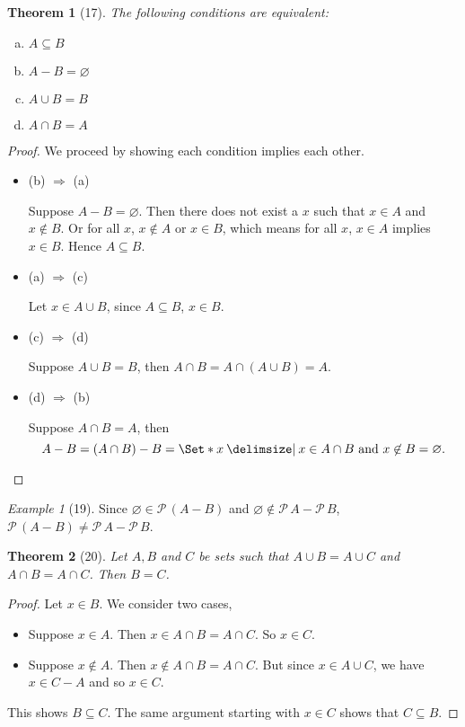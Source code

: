 \documentclass[12pt]{article}
\theoremstyle{plain}
\newtheorem*{exthm}{Theorem}
\theoremstyle{remark}
\newtheorem*{eg}{Example}
\theoremstyle{definition}
\theoremstyle{remark}
\newcommand{\powerset}{\mathscr{P}\,}
\providecommand\st{}
\newcommand\SetSymbol[1][]{%
  \nonscript\:#1\vert%
  \allowbreak%
  \nonscript\:
\mathopen{}}
\renewcommand\st{\SetSymbol[\delimsize]}
\begin{document}
\begin{exthm}[17]
  The following conditions are equivalent:
  \begin{multicols}{2}
    \begin{enumerate}[(a)]
      \item $A \subseteq B$
      \item $A - B = \varnothing$
      \item $A \cup B = B$
      \item $A \cap B = A$
    \end{enumerate}
  \end{multicols}
\end{exthm}
\begin{proof}
  We proceed by showing each condition implies each other.
  \begin{itemize}
    \item (b) $\Rightarrow$ (a)

      Suppose $A - B = \varnothing$. Then there does not exist a $x$ such that $x \in A$ and $x \not\in B$. Or for all $x$, $x \not\in A$ or $x \in B$, which means for all $x$, $x \in A$ implies $x \in B$. Hence $A \subseteq B$.
    \item (a) $\Rightarrow$ (c)

      Let $x \in A \cup B$, since $A \subseteq B$, $x \in B$.

    \item (c) $\Rightarrow$ (d)

      Suppose $A \cup B = B$, then $A \cap B = A \cap (A \cup B) = A$.

    \item (d) $\Rightarrow$ (b)

      Suppose $A \cap B = A$, then
      \[
        A - B = (A \cap B) - B = \Set*{x \st x \in A \cap B\ \text{and}\ x \not\in B} = \varnothing.
      \]

  \end{itemize}
\end{proof}
\begin{eg}[19]
  Since $\varnothing \in \powerset (A - B)$ and $\varnothing \not\in \powerset A - \powerset B$, $\powerset(A - B) \neq \powerset A - \powerset B$.
\end{eg}

\begin{exthm}[20]
  Let $A, B$ and $C$ be sets such that $A \cup B = A \cup C$ and $A \cap B = A \cap C$. Then $B = C$.
\end{exthm}
\begin{proof}
  Let $x \in B$. We consider two cases,
  \begin{itemize}
    \item Suppose $x \in A$. Then $x \in A \cap B = A \cap C$. So $x \in C$.
    \item Suppose $x \not\in A$. Then $x \not\in A \cap B = A \cap C$. But since $x \in A \cup C$, we have $x \in C - A$ and so $x \in C$.
  \end{itemize}
  This shows $B \subseteq C$. The same argument starting with $x \in C$ shows that $C \subseteq B$.
\end{proof}
\end{document}
